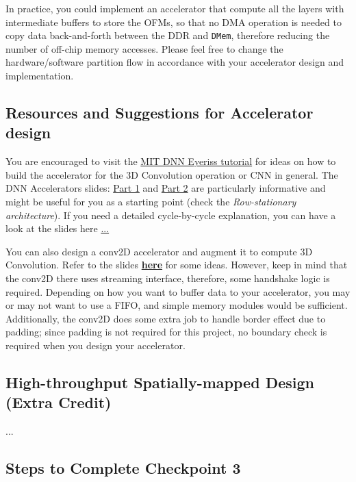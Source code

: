 \documentclass[11pt]{article}
\begin{document}
In practice, you could implement an accelerator that compute all the layers with intermediate buffers to store the OFMs, so that no DMA operation is needed to copy data back-and-forth between the DDR and \texttt{DMem}, therefore reducing the number of off-chip memory accesses. Please feel free to change the hardware/software partition flow in accordance with your accelerator design and implementation.

\subsection{Resources and Suggestions for Accelerator design}

You are encouraged to visit the \href{http://eyeriss.mit.edu/tutorial.html}{MIT DNN Eyeriss tutorial} for ideas on how to build the accelerator for the 3D Convolution operation or CNN in general. The DNN Accelerators slides: \href{http://www.rle.mit.edu/eems/wp-content/uploads/2019/06/Tutorial-on-DNN-05-DNN-Accelerator-Architectures.pdf}{Part 1} and \href{http://www.rle.mit.edu/eems/wp-content/uploads/2019/06/Tutorial-on-DNN-06-RS-Dataflow-and-NoC.pdf}{Part 2} are particularly informative and might be useful for you as a starting point (check the \textit{Row-stationary architecture}). If you need a detailed cycle-by-cycle explanation, you can have a look at the slides here \href{}{...}

You can also design a conv2D accelerator and augment it to compute 3D Convolution. Refer to the slides \href{https://drive.google.com/file/d/1QGFzt3gZ53IK1ZCIaJ57NUKucU77Nwd-}{\textbf{here}} for some ideas. However, keep in mind that the conv2D there uses streaming interface, therefore, some handshake logic is required. Depending on how you want to buffer data to your accelerator, you may or may not want to use a FIFO, and simple memory modules would be sufficient. Additionally, the conv2D does some extra job to handle border effect due to padding; since padding is not required for this project, no boundary check is required when you design your accelerator.

\subsection{High-throughput Spatially-mapped Design (Extra Credit)}

...

\subsection{Steps to Complete Checkpoint 3}
\end{document}
